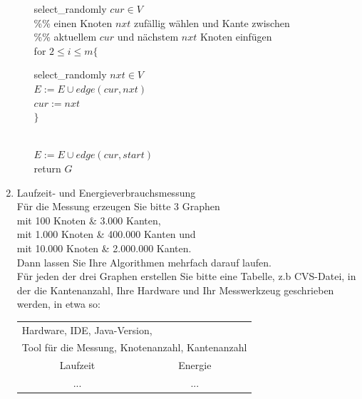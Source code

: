 \documentclass{article}
\begin{document}
\begin{appendix}
\begin{enumerate}
\begin{enumerate}
{{						select\_randomly $cur \in V$\\
						
						\%\%  einen  Knoten $nxt$ zufällig wählen und  Kante zwischen\\
						\%\%  aktuellem $cur$  und nächstem $nxt$ Knoten einfügen\\[2mm]
						for $ 2\le i \le m \{$  \\ \hspace*{1cm}
						\parbox{.7\linewidth}{
								select\_randomly $nxt\in V$\\ 
								$E:=E \cup edge(cur,nxt)$\\
								$cur:=nxt$\\
									$\}$
									}
								\\
						$E:=E \cup edge(cur,start)$\\
						return $G$
				}}				
	
	\end{enumerate}
										
\newpage

       \item Laufzeit- und Energieverbrauchsmessung\\
			    Für die Messung erzeugen Sie bitte  3  Graphen\\ \hspace*{1cm} 
					mit 100 Knoten \& 3.000 Kanten, \\  \hspace*{1cm} 
					mit 1.000 Knoten \& 400.000 Kanten und \\ \hspace*{1cm} 
					mit 10.000  Knoten \& 2.000.000 Kanten.\\
					Dann lassen Sie Ihre Algorithmen mehrfach darauf laufen.\\
					
					Für jeden der drei Graphen erstellen Sie bitte  eine Tabelle, z.b CVS-Datei, 
					in der die Kantenanzahl, Ihre Hardware und Ihr Messwerkzeug geschrieben werden, in etwa so:
					
					\begin{tabular}{|c|c|}
						\hline
						\multicolumn{2}{|l|}{Hardware, IDE, Java-Version, } \\
						\multicolumn{2}{|l|}{ Tool für die Messung, Knotenanzahl, Kantenanzahl} \\ \hline \hline
						Laufzeit & Energie \\ \hline
						 ... &  ...\\ \hline
					\end{tabular}
			

\end{enumerate}
\end{appendix}
\end{document}
